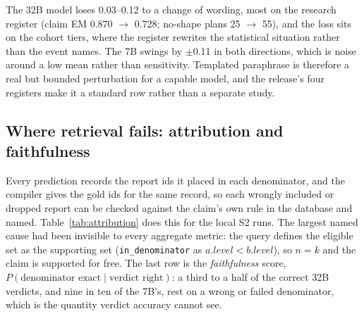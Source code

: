 The 32B model loses 0.03--0.12 to a change of wording, most on the research
register (claim EM 0.870 $\rightarrow$ 0.728; no-shape plans 25 $\rightarrow$
55), and the loss sits on the cohort tiers, where the register rewrites the
statistical situation rather than the event names. The 7B swings by $\pm$0.11
in both directions, which is noise around a low mean rather than sensitivity.
Templated paraphrase is therefore a real but bounded perturbation for a capable
model, and the release's four registers make it a standard row rather than a
separate study.

\subsection{Where retrieval fails: attribution and faithfulness}

Every prediction records the report ids it placed in each denominator, and the
compiler gives the gold ids for the same record, so each wrongly included or
dropped report can be checked against the claim's own rule in the database and
named. Table~\ref{tab:attribution} does this for the local S2 runs. The largest
named cause had been invisible to every aggregate metric: the query defines the
eligible set as the supporting set (\texttt{in\_denominator} as $a.\mathit{level} <
b.\mathit{level}$), so $n = k$ and the claim is supported for free. The last row
is the \emph{faithfulness} score, $P(\text{denominator exact} \mid \text{verdict
right})$: a third to a half of the correct 32B verdicts, and nine in ten of
the 7B's, rest on a wrong or failed denominator, which is the quantity verdict
accuracy cannot see.


